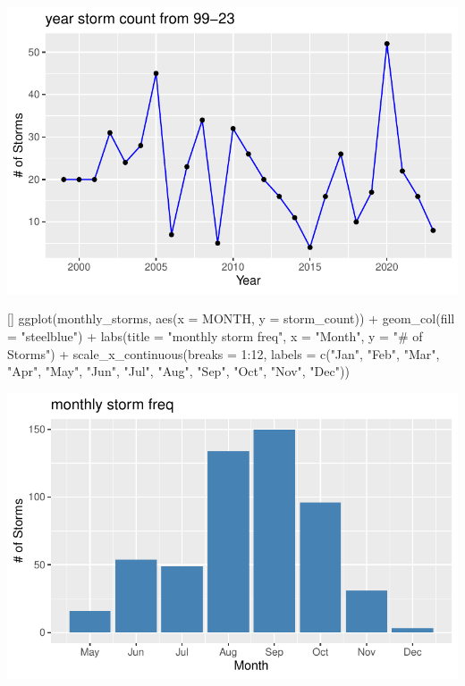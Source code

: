 \documentclass[12pt,letterpaper]{article}
\newenvironment{Shaded}{\begin{snugshade}}{\end{snugshade}}
\newenvironment{Highlighting}{}{}
\newcommand{\DecValTok}[1]{\textcolor[rgb]{0.00,0.00,0.81}{#1}}
\newcommand{\StringTok}[1]{\textcolor[rgb]{0.31,0.60,0.02}{#1}}
\newcommand{\FunctionTok}[1]{\textcolor[rgb]{0.00,0.00,0.00}{#1}}
\newcommand{\NormalTok}[1]{#1}
\newcommand{\SpecialCharTok}[1]{\textcolor[rgb]{0.00,0.00,0.00}{#1}}
\newcommand{\AttributeTok}[1]{\textcolor[rgb]{0.77,0.63,0.00}{#1}}
\begin{document}
\includegraphics{GroupTask3_files/figure-pdf/Plots-1.pdf}

\begin{Shaded}
\begin{Highlighting}[]
\FunctionTok{ggplot}\NormalTok{(monthly\_storms, }\FunctionTok{aes}\NormalTok{(}\AttributeTok{x =}\NormalTok{ MONTH, }\AttributeTok{y =}\NormalTok{ storm\_count)) }\SpecialCharTok{+}
  \FunctionTok{geom\_col}\NormalTok{(}\AttributeTok{fill =} \StringTok{"steelblue"}\NormalTok{) }\SpecialCharTok{+}
  \FunctionTok{labs}\NormalTok{(}\AttributeTok{title =} \StringTok{"monthly storm freq"}\NormalTok{,}
       \AttributeTok{x =} \StringTok{"Month"}\NormalTok{,}
       \AttributeTok{y =} \StringTok{"\# of Storms"}\NormalTok{) }\SpecialCharTok{+}
  \FunctionTok{scale\_x\_continuous}\NormalTok{(}\AttributeTok{breaks =} \DecValTok{1}\SpecialCharTok{:}\DecValTok{12}\NormalTok{,}
                     \AttributeTok{labels =} \FunctionTok{c}\NormalTok{(}\StringTok{"Jan"}\NormalTok{, }\StringTok{"Feb"}\NormalTok{, }\StringTok{"Mar"}\NormalTok{, }\StringTok{"Apr"}\NormalTok{, }\StringTok{"May"}\NormalTok{, }\StringTok{"Jun"}\NormalTok{, }
                                \StringTok{"Jul"}\NormalTok{, }\StringTok{"Aug"}\NormalTok{, }\StringTok{"Sep"}\NormalTok{, }\StringTok{"Oct"}\NormalTok{, }\StringTok{"Nov"}\NormalTok{, }\StringTok{"Dec"}\NormalTok{))}
\end{Highlighting}
\end{Shaded}

\includegraphics{GroupTask3_files/figure-pdf/Plots-2.pdf}
\end{document}
